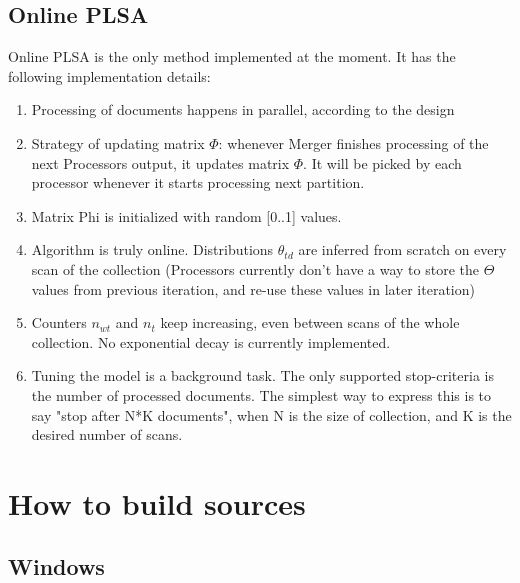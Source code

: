 \documentclass[11pt,a4paper,twoside]{report}
\begin{document}
\subsection{Online PLSA}
Online PLSA is the only method implemented at the moment.
It has the following implementation details:
\begin{enumerate}
    \item Processing of documents happens in parallel, according to the design
    \item Strategy of updating matrix $\Phi$: whenever Merger finishes processing of the next Processors output,
    it updates matrix $\Phi$. It will be picked by each processor whenever it starts processing next partition.
    \item Matrix Phi is initialized with random [0..1] values.
    \item Algorithm is truly online. Distributions $\theta_{t d}$ are inferred from scratch on every scan of the collection (Processors currently don't have a way to store the $\Theta$ values from previous iteration, 
        and re-use these values in later iteration)
    \item Counters $n_{w t}$ and $n_t$ keep increasing, even between scans of the whole collection. 
    No exponential decay is currently implemented.         
    \item Tuning the model is a background task. The only supported stop-criteria is the number of processed documents. The simplest way to express this is to say "stop after N*K documents", when N is the size of collection,
        and K is the desired number of scans.
\end{enumerate}

\section{How to build sources}

\subsection{Windows}
\end{document}
